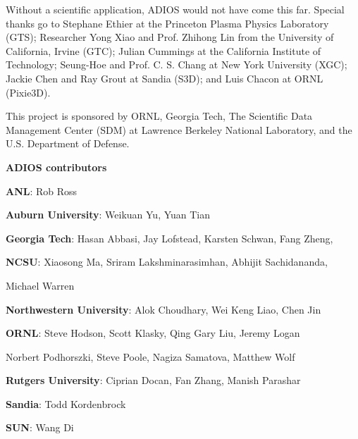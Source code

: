 \vspace{6pt}
Without a scientific application, ADIOS would not have come this far. Special thanks 
go to Stephane Ethier at the Princeton Plasma Physics Laboratory (GTS); Researcher 
Yong Xiao and Prof. Zhihong Lin from the University of California, Irvine (GTC); 
Julian Cummings at the California Institute of Technology; Seung-Hoe and Prof. 
C. S. Chang at New York University (XGC); Jackie Chen and Ray Grout at Sandia (S3D); 
and Luis Chacon at ORNL (Pixie3D). 

\vspace{6pt}
This project is sponsored by ORNL, Georgia Tech, The Scientific Data Management 
Center (SDM) at Lawrence Berkeley National Laboratory, and the U.S. Department 
of Defense. 

\vspace{6pt}
{\Large \textbf{ADIOS contributors}}

\vspace{6pt}
\leftskip=36pt
\parindent=-36pt
\textbf{ANL}: Rob Ross

\vspace{6pt}
\textbf{Auburn University}: Weikuan Yu, Yuan Tian

\vspace{6pt}
\textbf{Georgia Tech}: Hasan Abbasi, Jay Lofstead, Karsten Schwan, Fang Zheng,

\vspace{6pt}
\textbf{NCSU}: Xiaosong Ma, Sriram Lakshminarasimhan, Abhijit Sachidananda, 

\vspace{6pt}
Michael Warren 

\vspace{6pt}
\textbf{Northwestern University}: Alok Choudhary, Wei Keng Liao, Chen Jin

\vspace{6pt}
\textbf{ORNL}: Steve Hodson, Scott Klasky, Qing Gary Liu, Jeremy Logan

\vspace{6pt}
Norbert Podhorszki, Steve Poole, Nagiza Samatova, Matthew Wolf

\vspace{6pt}
\textbf{Rutgers University}: Ciprian Docan, Fan Zhang, Manish Parashar

\vspace{6pt}
\textbf{Sandia}: Todd Kordenbrock

\vspace{6pt}
\textbf{SUN}: Wang Di\label{HToc82067512}\label{HToc84890214}\label{HToc212016589}\label{HToc212016831}\label{HToc82064257}\label{HToc182553322}

